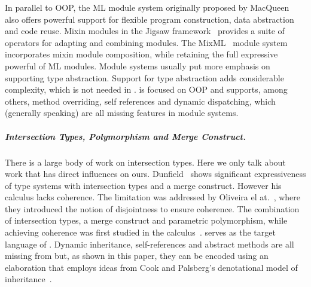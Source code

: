 In parallel to OOP, the ML module system originally proposed by
MacQueen~\cite{MacQueen_1984} also offers powerful support for flexible program
construction, data abstraction and code reuse. Mixin modules in the
Jigsaw framework~\cite{Bracha92modularitymeets} provides a suite of operators
for adapting and combining modules. The MixML~\cite{Rossberg_2013} module
system incorporates mixin module composition, while retaining the full
expressive powerful of ML modules. Module systems usually put more emphasis on
supporting type abstraction. Support for type abstraction
adds considerable complexity, which is not needed in \name. \name is focused on
OOP and supports, among others, method overriding, self references and dynamic
dispatching, which (generally speaking) are all missing features in module systems.



\subparagraph{Intersection Types, Polymorphism and Merge Construct.} There
is a large body of work on intersection types. Here we only talk about work that
has direct influences on ours. Dunfield~\cite{dunfield2014elaborating} shows
significant expressiveness of type systems with intersection types and a merge
construct. However his calculus lacks coherence. The limitation was addressed by
Oliveira el at.~\cite{oliveira2016disjoint}, where they introduced the notion of
disjointness to ensure coherence. The combination of intersection types, a merge
construct and parametric polymorphism, while achieving coherence was first
studied in the \fname calculus~\cite{alpuimdisjoint}.
\fname serves as the target language
of \name. Dynamic inheritance, self-references and abstract methods
are all missing from \fname but, as shown in this paper, they can be
encoded using an elaboration that employs ideas from Cook and
Palsberg's denotational model of inheritance~\cite{cook1989denotational}.


